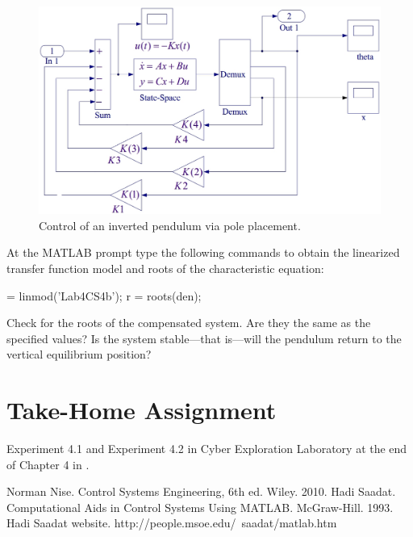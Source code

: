 \begin{figure}[bht]
\centering
\includegraphics[width=.9\textwidth]{StateFeedbackSimulink}
\caption{\footnotesize
        Control of an inverted pendulum via pole placement.
        \label{fig.poleplacesimulink}
        }
\end{figure}

At the MATLAB prompt type the following commands to obtain the linearized transfer function model and roots of the characteristic equation:
\begin{codex}
 = linmod('Lab4CS4b');
r = roots(den);
\end{codex}
Check for the roots of the compensated system.  Are they the same as the specified values?  Is the system stable---that is---will the pendulum return to the vertical equilibrium position?

\section{Take-Home Assignment}
Experiment 4.1 and Experiment 4.2 in Cyber Exploration Laboratory at the end of Chapter 4 in \cite{nise}.

\begin{thebibliography}{9}
     Norman Nise.  Control Systems Engineering, 6th ed.  Wiley.  2010.
     Hadi Saadat.  Computational Aids in Control Systems Using MATLAB.  McGraw-Hill.  1993.
     Hadi Saadat website. http://people.msoe.edu/~saadat/matlab.htm
\end{thebibliography}

